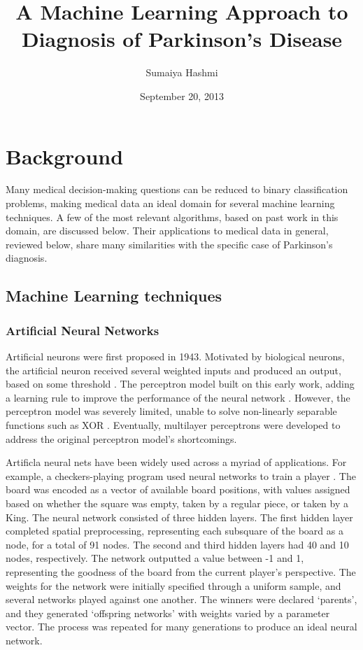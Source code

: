 \documentclass[draftcopy]{srpaper}
\title{A Machine Learning Approach to Diagnosis of Parkinson's Disease}
\author{Sumaiya Hashmi}
\date{September 20, 2013}
\begin{document}
\frontmatter

\chapter{Background}
\label{Chapter:One}
Many medical
decision-making questions can be reduced to binary
classification problems, making medical data an ideal domain for
several machine learning techniques. A few of the most relevant
algorithms, based on past work in this domain, are discussed
below. Their applications to medical data in general, reviewed below,
share many similarities with the specific case of
Parkinson's diagnosis.

\section{Machine Learning techniques}
\subsection{Artificial Neural Networks}
Artificial neurons were first proposed in 1943. Motivated by biological neurons, the artificial neuron received
several weighted inputs and produced an output, based on some
threshold \cite{MP43}. The perceptron model built on this early
work, adding a learning rule to improve the performance of the neural
network \cite{Ros58}. However, the perceptron model was severely limited, unable to
solve non-linearly separable functions such as XOR \cite{MP69}. Eventually, multilayer perceptrons were developed to
address the original perceptron model's shortcomings. 

Artificla neural nets have been widely used across a myriad of
applications. For example, a checkers-playing program used neural networks to train a player \cite{CF01}. The board was encoded as a vector of
available board positions, with values assigned based on whether the
square was empty, taken by a regular piece, or taken by a King. The
neural network consisted of three hidden layers. The first hidden
layer completed
spatial preprocessing, representing each subsquare of the board as a
node, for a total of 91 nodes. The second and third hidden layers had
40 and 10 nodes, respectively. The network outputted a value between
-1 and 1, representing the goodness of the board from the current
player's perspective. The weights for the network were initially
specified through a uniform sample, and several networks played against one
another. The winners were declared `parents', and they generated
`offspring networks' with weights varied by a parameter vector. The
process was repeated for many generations to produce an ideal neural
network.
\end{document}
